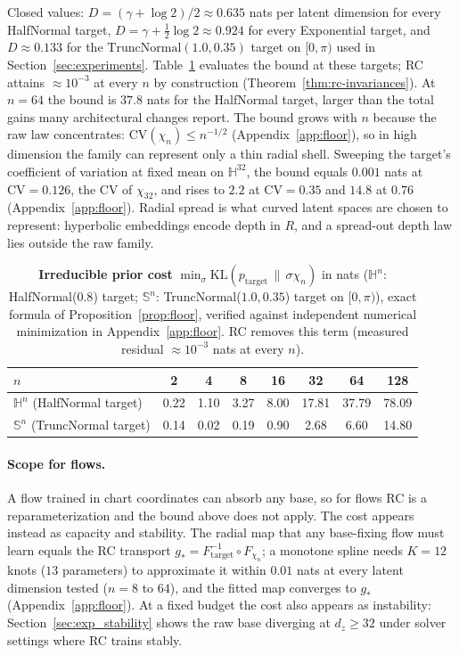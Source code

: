 \documentclass{article}
\newcommand{\KL}{\mathrm{KL}}
\theoremstyle{definition}
\theoremstyle{remark}
\newcommand{\SSS}{\mathbb{S}}
\newcommand{\HH}{\mathbb{H}}
\begin{document}
Closed values: $D=(\gamma+\log 2)/2\approx 0.635$ nats per latent dimension for every HalfNormal target, $D=\gamma+\tfrac12\log2\approx0.924$ for every Exponential target, and $D\approx0.133$ for the $\mathrm{TruncNormal}(1.0,0.35)$ target on $[0,\pi)$ used in Section~\ref{sec:experiments}. Table~\ref{tab:floor_main} evaluates the bound at these targets; RC attains $\approx10^{-3}$ at every $n$ by construction (Theorem~\ref{thm:rc-invariances}). At $n{=}64$ the bound is $37.8$ nats for the HalfNormal target, larger than the total gains many architectural changes report. The bound grows with $n$ because the raw law concentrates: $\mathrm{CV}(\chi_n)\le n^{-1/2}$ (Appendix~\ref{app:floor}), so in high dimension the family can represent only a thin radial shell. Sweeping the target's coefficient of variation at fixed mean on $\HH^{32}$, the bound equals $0.001$ nats at $\mathrm{CV}=0.126$, the CV of $\chi_{32}$, and rises to $2.2$ at $\mathrm{CV}{=}0.35$ and $14.8$ at $0.76$ (Appendix~\ref{app:floor}). Radial spread is what curved latent spaces are chosen to represent: hyperbolic embeddings encode depth in $R$, and a spread-out depth law lies outside the raw family.

\begin{table}[t]
  \centering
  \caption{\textbf{Irreducible prior cost} $\min_\sigma\KL(p_{\text{target}}\,\|\,\sigma\chi_n)$ in nats ($\HH^n$: HalfNormal($0.8$) target; $\SSS^n$: TruncNormal($1.0,0.35$) target on $[0,\pi)$), exact formula of Proposition~\ref{prop:floor}, verified against independent numerical minimization in Appendix~\ref{app:floor}. RC removes this term (measured residual $\approx10^{-3}$ nats at every $n$).}
  \label{tab:floor_main}
  \small
  \begin{tabular}{lccccccc}
    \toprule
    $n$ & 2 & 4 & 8 & 16 & 32 & 64 & 128 \\
    \midrule
    $\HH^n$ (HalfNormal target) & 0.22 & 1.10 & 3.27 & 8.00 & 17.81 & 37.79 & 78.09 \\
    $\SSS^n$ (TruncNormal target) & 0.14 & 0.02 & 0.19 & 0.90 & 2.68 & 6.60 & 14.80 \\
    \bottomrule
  \end{tabular}
\end{table}



\paragraph{Scope for flows.} A flow trained in chart coordinates can absorb any base, so for flows RC is a reparameterization and the bound above does not apply. The cost appears instead as capacity and stability. The radial map that any base-fixing flow must learn equals the RC transport $g_*=F_{\text{target}}^{-1}\!\circ F_{\chi_n}$; a monotone spline needs $K{=}12$ knots ($13$ parameters) to approximate it within $0.01$ nats at every latent dimension tested ($n=8$ to $64$), and the fitted map converges to $g_*$ (Appendix~\ref{app:floor}). At a fixed budget the cost also appears as instability: Section~\ref{sec:exp_stability} shows the raw base diverging at $d_z\ge 32$ under solver settings where RC trains stably.
\end{document}
